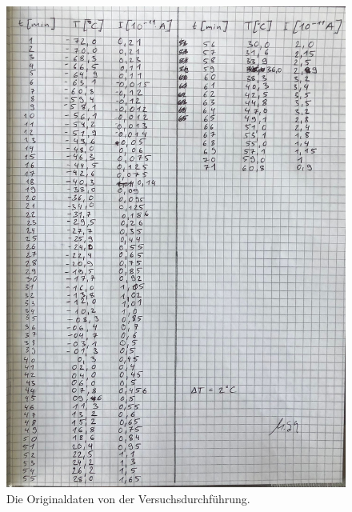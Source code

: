 \begin{figure}
    \centering
    \includegraphics[width=\textwidth]{bilder/Anhang_2.jpeg}
    \caption{Die Originaldaten von der Versuchsdurchführung.}
    \label{fig:originaldaten2}
\end{figure}
